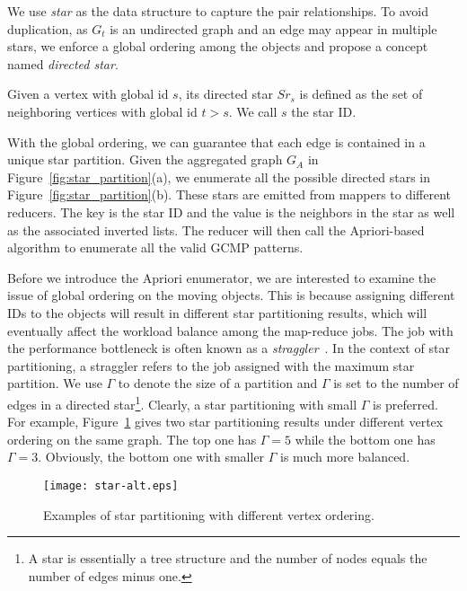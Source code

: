 We use \emph{star} as the data structure to capture the pair relationships. 
To avoid duplication, as $G_t$ is an undirected graph and an edge may appear in multiple stars, 
we enforce a global ordering among the objects and propose a concept named \textit{directed star}.

\begin{definition}
Given a vertex with global id $s$, its directed star $Sr_s$ is defined as the set of neighboring vertices with global id $t>s$. We call $s$ the star ID.
\end{definition}

With the global ordering, we can guarantee that each edge is contained in a unique star partition. Given the aggregated graph $G_A$  in Figure~\ref{fig:star_partition}(a), we enumerate all the possible directed stars in Figure~\ref{fig:star_partition}(b). These stars are emitted from mappers to different reducers. The key is the star ID and the value is the neighbors in the star as well as the associated inverted lists. 
The reducer will then call the Apriori-based algorithm to enumerate all the valid GCMP patterns.


Before we introduce the Apriori enumerator, we are interested to 
examine the issue of global ordering on the moving objects.
This is because assigning different IDs to the objects will result in 
different star partitioning results, which will eventually affect the workload 
balance among the map-reduce jobs. The job with the performance bottleneck is often known as a  \emph{straggler}~\cite{kwon2012skewtune,coppa2015data}. In the context of star partitioning, a straggler refers to the job assigned with the maximum star partition. We use $\Gamma$ to denote the size of a partition and $\Gamma$ is set to the number of edges in a directed star\footnote{A star is essentially a tree structure and the number of nodes equals the number of edges minus one.}. Clearly, a star partitioning with small $\Gamma$ is preferred. For example, Figure~\ref{fig:star-alt} gives two star partitioning results under 
different vertex ordering on the same graph. The top one has $\Gamma = 5$ while the bottom one has $\Gamma = 3$. Obviously, the bottom one with smaller $\Gamma$ is much more balanced.

\begin{figure}[h]
\centering
\texttt{[image: star-alt.eps]}
\caption{Examples of star partitioning with different vertex ordering.}
\label{fig:star-alt}
\end{figure}

